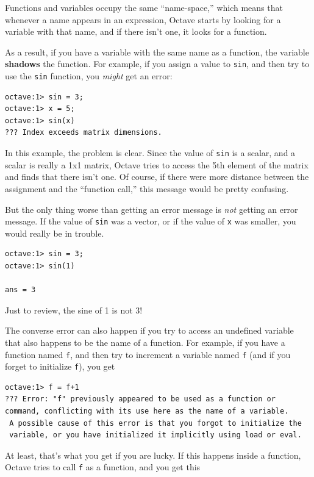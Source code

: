 \documentclass{book}
\begin{document}
Functions and variables occupy the same ``name-space,'' which means
that whenever a name appears in an expression, Octave starts by looking
for a variable with that name, and if there isn't one, it looks for
a function.

As a result, if you have a variable with the same name as a function,
the variable {\bf shadows} the function. For example, if you assign
a value to {\tt sin}, and then try to use the {\tt sin} function, you
{\em might} get an error:

\begin{verbatim}
octave:1> sin = 3;
octave:1> x = 5;
octave:1> sin(x)
??? Index exceeds matrix dimensions.
\end{verbatim}

In this example, the problem is clear. Since the value of {\tt sin}
is a scalar, and a scalar is really a 1x1 matrix, Octave tries to
access the 5th element of the matrix and finds that there isn't one.
Of course, if there were more distance between the assignment
and the ``function call,'' this message would be pretty confusing.

But the only thing worse than getting an error message is {\em not}
getting an error message. If the value of {\tt sin} was a vector,
or if the value of {\tt x} was smaller, you would really
be in trouble.

\begin{verbatim}
octave:1> sin = 3;
octave:1> sin(1)

ans = 3
\end{verbatim}

Just to review, the sine of 1 is not 3!

The converse error can also happen if you try to access an
undefined variable that also happens to be the name of a function.
For example, if you have a function named {\tt f}, and then
try to increment a variable named {\tt f} (and if you forget to
initialize {\tt f}), you get

\begin{verbatim}
octave:1> f = f+1
??? Error: "f" previously appeared to be used as a function or 
command, conflicting with its use here as the name of a variable.
 A possible cause of this error is that you forgot to initialize the
 variable, or you have initialized it implicitly using load or eval.
\end{verbatim}

At least, that's what you get if you are lucky. If this happens
inside a function, Octave tries to call {\tt f} as a function,
and you get this
\end{document}
